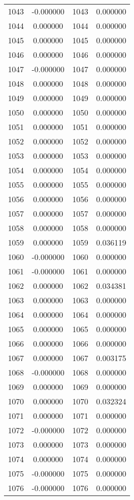 \documentclass[12pt]{article}
\begin{document}
\begin{longtable}{@{}cccc@{}}
1043 & -0.000000 & 1043 & 0.000000 \\
1044 & 0.000000 & 1044 & 0.000000 \\
1045 & 0.000000 & 1045 & 0.000000 \\
1046 & 0.000000 & 1046 & 0.000000 \\
1047 & -0.000000 & 1047 & 0.000000 \\
1048 & 0.000000 & 1048 & 0.000000 \\
1049 & 0.000000 & 1049 & 0.000000 \\
1050 & 0.000000 & 1050 & 0.000000 \\
1051 & 0.000000 & 1051 & 0.000000 \\
1052 & 0.000000 & 1052 & 0.000000 \\
1053 & 0.000000 & 1053 & 0.000000 \\
1054 & 0.000000 & 1054 & 0.000000 \\
1055 & 0.000000 & 1055 & 0.000000 \\
1056 & 0.000000 & 1056 & 0.000000 \\
1057 & 0.000000 & 1057 & 0.000000 \\
1058 & 0.000000 & 1058 & 0.000000 \\
1059 & 0.000000 & 1059 & 0.036119 \\
1060 & -0.000000 & 1060 & 0.000000 \\
1061 & -0.000000 & 1061 & 0.000000 \\
1062 & 0.000000 & 1062 & 0.034381 \\
1063 & 0.000000 & 1063 & 0.000000 \\
1064 & 0.000000 & 1064 & 0.000000 \\
1065 & 0.000000 & 1065 & 0.000000 \\
1066 & 0.000000 & 1066 & 0.000000 \\
1067 & 0.000000 & 1067 & 0.003175 \\
1068 & -0.000000 & 1068 & 0.000000 \\
1069 & 0.000000 & 1069 & 0.000000 \\
1070 & 0.000000 & 1070 & 0.032324 \\
1071 & 0.000000 & 1071 & 0.000000 \\
1072 & -0.000000 & 1072 & 0.000000 \\
1073 & 0.000000 & 1073 & 0.000000 \\
1074 & 0.000000 & 1074 & 0.000000 \\
1075 & -0.000000 & 1075 & 0.000000 \\
1076 & -0.000000 & 1076 & 0.000000 \\

\end{longtable}
\end{document}
